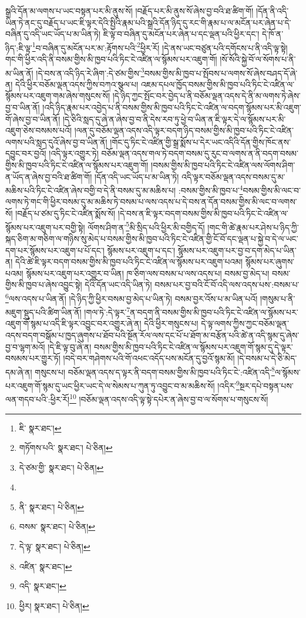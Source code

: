 སྒྲའི་དོན་མ་ལགས་པ་ཡང་བསྟན་པར་མི་ནུས་སོ། །བརྗོད་པར་མི་ནུས་སོ་ཞེས་བྱ་བའི་ཐ་ཚིག་གོ། །དོན་ནི་འདི་ཡིན་ཏེ་ནང་དུ་བརྗོད་པ་ཡང་ཇི་ལྟར་དེའི་སྤྱིའི་རྣམ་པའི་སྒྲའི་དོན་ཉིད་དུ་རང་གི་རྣམ་པ་ལ་མངོན་པར་ཞེན་པ་དེ་བཞིན་དུ་འདི་ཡང་ཡོད་པ་མ་ཡིན་ཏེ། ཇི་ལྟ་བ་བཞིན་དུ་མངོན་པར་ཞེན་པ་དང་ལྡན་པའི་ཕྱིར་དང་། དེ་ཁོ་ན་ཉིད་:ཇི་ལྟ་\footnote{ཇི་  སྣར་ཐང་། }བ་བཞིན་དུ་མངོན་པར་མ་:རྟོགས་པའི་\footnote{གཏོགས་པའི་  སྣར་ཐང་།  པེ་ཅིན། }ཕྱིར་རོ། །དེ་ནས་ཡང་བཙུན་པའི་དགོངས་པ་ནི་འདི་ལྟ་སྟེ། གང་གི་ཕྱིར་འདི་ནི་བསམ་གྱིས་མི་ཁྱབ་པའི་ཏིང་ངེ་འཛིན་ལ་སྙོམས་པར་འཇུག་གོ། །སོ་སོའི་སྐྱེ་བོ་ལ་སོགས་པ་ནི་མ་ཡིན་ནོ། །དེ་བས་ན་འདི་ཉིད་རེ་ཞིག་:དེ་ཙམ་གྱིས་\footnote{དེ་ཙམ་གྱི་  སྣར་ཐང་།  པེ་ཅིན། }བསམ་གྱིས་མི་ཁྱབ་པ་སྤོབས་པ་ལགས་སོ་ཞེས་བཤད་དོ་ཞེ་ན། དེའི་ཕྱིར་བཅོམ་ལྡན་འདས་ཀྱིས་བཀའ་སྩལ་པ། འཇམ་དཔལ་ཁྱོད་བསམ་གྱིས་མི་ཁྱབ་པའི་ཏིང་ངེ་འཛིན་ལ་སྙོམས་པར་འཇུག་གམ་ཞེས་གསུངས་སོ། །དེ་ཉིད་ཀྱང་སྤོང་བར་བྱེད་པ་ནི་བཅོམ་ལྡན་འདས་དེ་ནི་མ་ལགས་ཏེ་ཞེས་བྱ་བ་ཡིན་ནོ། །འདི་ཉིད་རྣམ་པར་འབྱེད་པ་ནི་བསམ་གྱིས་མི་ཁྱབ་པའི་ཏིང་ངེ་འཛིན་ལ་བདག་སྙོམས་པར་མི་འཇུག་གོ་ཞེས་བྱ་བ་ཡིན་ནོ། །དེ་ཅིའི་སླད་དུ་ཞེ་ན་ཞེས་བྱ་བ་ནི་དེས་རབ་ཏུ་ཕྱེ་བ་ཡིན་ན་ཇི་ལྟར་དེ་ལ་སྙོམས་པར་མི་འཇུག་ཅེས་བསམས་པའོ། །ལན་དུ་བཅོམ་ལྡན་འདས་འདི་ལྟར་བདག་ཉིད་བསམ་གྱིས་མི་ཁྱབ་པའི་ཏིང་ངེ་འཛིན་ལགས་པའི་སླད་དུའོ་ཞེས་བྱ་བ་ཡིན་ནོ། །གོང་དུ་ཏིང་ངེ་འཛིན་གྱི་སྒྲ་སྨོས་པ་དེར་ཡང་འདིའི་དོན་གྱིས་ཁོང་ནས་དབྱུང་བར་བྱའོ། །འདི་ལྟར་འགྱུར་ཏེ། བཅོམ་ལྡན་འདས་གལ་ཏེ་བདག་བསམ་དུ་རུང་བ་ལགས་ན་ནི་བདག་བསམ་གྱིས་མི་ཁྱབ་པའི་ཏིང་ངེ་འཛིན་ལ་སྙོམས་པར་འཇུག་གོ། །བསམ་གྱིས་མི་ཁྱབ་པའི་ཏིང་ངེ་འཛིན་ལས་ལོགས་ཤིག་ན་ཡོད་ན་ཞེས་བྱ་བའི་ཐ་ཚིག་གོ། །དོན་འདི་ཡང་ཡོད་པ་མ་ཡིན་ཏེ། འདི་ལྟར་བཅོམ་ལྡན་འདས་བསམ་དུ་མ་མཆིས་པའི་ཏིང་ངེ་འཛིན་ཞེས་བགྱི་བ་དེ་ནི་བསམ་དུ་མ་མཆིས་པ། :བསམ་གྱིས་མི་ཁྱབ་པ་\footnote{}བསམ་གྱིས་མི་ལང་བ་ལགས་ཏེ་གང་གི་ཕྱིར་བསམ་དུ་མ་མཆིས་ཏེ་བསམ་པ་ལས་འདས་པ་དེ་བས་ན་དོན་བསམ་གྱིས་མི་ལང་བ་ལགས་སོ། །བརྗོད་པ་ཙམ་དུ་ཏིང་ངེ་འཛིན་སྨོས་སོ། །དེ་བས་ན་ཇི་ལྟར་བདག་བསམ་གྱིས་མི་ཁྱབ་པའི་ཏིང་ངེ་འཛིན་ལ་སྙོམས་པར་འཇུག་པར་བགྱི་སྟེ། ལོགས་ཤིག་ན་\footnote{ནི་  སྣར་ཐང་།  པེ་ཅིན། }མི་སྲིད་པའི་ཕྱིར་མི་བགྱིད་དོ། །གང་གི་ཚེ་རྣམ་པར་ཤེས་པ་ཉིད་ཀྱི་སྐད་ཅིག་མ་གཅིག་ལ་གཉིས་སུ་མེད་པ་བསམ་གྱིས་མི་ཁྱབ་པའི་ཏིང་ངེ་འཛིན་གྱི་ངོ་བོ་དང་ལྡན་པ་སྐྱེ་བ་དེ་ལ་ཡང་དག་པར་སྙོམས་པར་འཇུག་པ་པོ་དང་། སྙོམས་པར་འཇུག་པ་དང་། སྙོམས་པར་འཇུག་པར་བྱ་བ་དག་མེད་པ་ཡིན་ན། དེའི་ཚེ་ཇི་ལྟར་བདག་བསམ་གྱིས་མི་ཁྱབ་པའི་ཏིང་ངེ་འཛིན་ལ་སྙོམས་པར་འཇུག་པའམ། སྙོམས་པར་ཞུགས་པའམ། སྙོམས་པར་འཇུག་པར་འགྱུར་བ་ཡིན། ཁ་ཅིག་ལས་བསམ་པ་ལས་འདས་པ། བསམ་བྱ་མེད་པ། བསམ་གྱིས་མི་ཁྱབ་པ་ཞེས་འབྱུང་སྟེ། དེའི་དོན་ཡང་འདི་ཡིན་ཏེ། བསམ་པར་བྱ་བའི་ངོ་བོ་འདི་ལས་འདས་པས་:བསམ་པ་\footnote{བསམ་  སྣར་ཐང་།  པེ་ཅིན། }ལས་འདས་པ་ཡིན་ནོ། །དེ་ཉིད་ཀྱི་ཕྱིར་བསམ་བྱ་མེད་པ་ཡིན་ཏེ། བསམ་བྱར་འོས་པ་མ་ཡིན་པའོ། །གསུམ་པ་ནི་མཇུག་སྡུད་པའི་ཚིག་ཡིན་ནོ། །གལ་ཏེ་:དེ་ལྟར་\footnote{དེ་ལྟ་  སྣར་ཐང་།  པེ་ཅིན། }ན་བདག་ནི་བསམ་གྱིས་མི་ཁྱབ་པའི་ཏིང་ངེ་འཛིན་ལ་སྙོམས་པར་འཇུག་གོ་སྙམ་པ་འདི་ཇི་ལྟར་འབྱུང་བར་འགྱུར་ཞེ་ན། དེའི་ཕྱིར་གསུངས་པ། དེ་ལྟ་ལགས་ཀྱིས་ཀྱང་བཅོམ་ལྡན་འདས་བདག་བསྒོམ་པ་ཁྱད་ཞུགས་པ་ཐོབ་པའི་སྔོན་རོལ་ལས་དང་པོ་པ་ཐོག་མ་བརྩོན་པའི་ཚེ་ན་འདི་སྙམ་དུ་ཞེས་བྱ་བ་ལྷག་མའོ། །དེ་ཇི་ལྟ་བུ་ཞེ་ན། བསམ་གྱིས་མི་ཁྱབ་པའི་ཏིང་ངེ་འཛིན་ལ་སྙོམས་པར་འཇུག་གོ་སྙམ་དུ་དེ་ལྟར་བསམས་པར་གྱུར་ཏོ། །བདེ་བར་གཤེགས་པའི་གོ་འཕང་འདོད་པས་མངོན་དུ་བྱའོ་སྙམ་མོ། །དེ་བསམ་པ་དེ་ཅི་མེད་དམ་ཞེ་ན། གསུངས་པ། བཅོམ་ལྡན་འདས་ད་ལྟར་ནི་བདག་བསམ་གྱིས་མི་ཁྱབ་པའི་ཏིང་ངེ་:འཛིན་འདི་\footnote{འཛིན་  སྣར་ཐང་། }ལ་སྙོམས་པར་འཇུག་གོ་སྙམ་དུ་ཡང་ཕྱིར་ཡང་དེ་ལ་སེམས་པ་ཀུན་ཏུ་འབྱུང་བ་མ་མཆིས་སོ། །འདིར་\footnote{འདི་  སྣར་ཐང་། }སྔར་དཔེ་བསྟན་པས་ལན་གདབ་པའི་:ཕྱིར་རོ།\footnote{ཕྱིར།  སྣར་ཐང་།  པེ་ཅིན། } །བཅོམ་ལྡན་འདས་འདི་ལྟ་སྟེ་དཔེར་ན་ཞེས་བྱ་བ་ལ་སོགས་པ་གསུངས་སོ། 